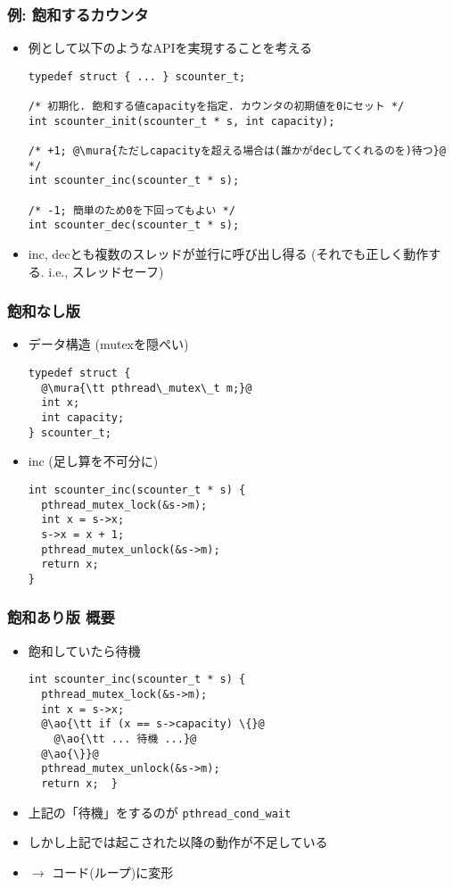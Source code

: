 \documentclass[12pt,dvipdfmx]{beamer}
\begin{document}
\begin{frame}[fragile]
  \frametitle{例: 飽和するカウンタ}
  \begin{itemize}
  \item 例として以下のようなAPIを実現することを考える
\begin{lstlisting}
typedef struct { ... } scounter_t;

/* 初期化. 飽和する値capacityを指定. カウンタの初期値を0にセット */
int scounter_init(scounter_t * s, int capacity);

/* +1; @\mura{ただしcapacityを超える場合は(誰かがdecしてくれるのを)待つ}@ */
int scounter_inc(scounter_t * s);

/* -1; 簡単のため0を下回ってもよい */
int scounter_dec(scounter_t * s);
\end{lstlisting}
\item inc, decとも複数のスレッドが並行に呼び出し得る
  (それでも正しく動作する. i.e., スレッドセーフ)
\end{itemize}
\end{frame}

\begin{frame}[fragile]
  \frametitle{飽和なし版}
  \begin{itemize}
  \item データ構造 (mutexを隠ぺい)
\begin{lstlisting}
typedef struct {
  @\mura{\tt pthread\_mutex\_t m;}@
  int x;
  int capacity;
} scounter_t;
\end{lstlisting}
  \item inc (足し算を不可分に)
\begin{lstlisting}
int scounter_inc(scounter_t * s) {
  pthread_mutex_lock(&s->m);
  int x = s->x;
  s->x = x + 1;
  pthread_mutex_unlock(&s->m);
  return x;
}
\end{lstlisting}
\end{itemize}
\end{frame}

\begin{frame}[fragile]
  \frametitle{飽和あり版 概要}
  \begin{itemize}
  \item 飽和していたら待機
\begin{lstlisting}
int scounter_inc(scounter_t * s) {
  pthread_mutex_lock(&s->m);
  int x = s->x;
  @\ao{\tt if (x == s->capacity) \{}@
    @\ao{\tt ... 待機 ...}@
  @\ao{\}}@
  pthread_mutex_unlock(&s->m);
  return x;  }
\end{lstlisting}
\item 上記の「待機」をするのが {\tt pthread\_cond\_wait}
\item しかし上記では起こされた以降の動作が不足している
\item $\rightarrow$ コード(ループ)に変形
  \end{itemize}
\end{frame}
\end{document}
